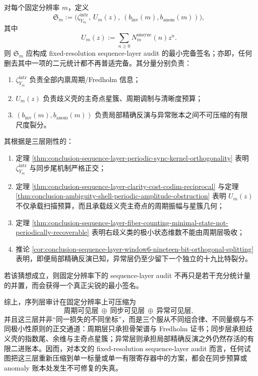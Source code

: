 \begin{conjecture}\label{conj:conclusion-sequence-layer-minimal-complete-audit-signature-triple}
对每个固定分辨率 \(m\)，定义
\[
\mathfrak S_m
:=
\bigl(
\zeta_{Y_m}^{\mathrm{intr}},
\ U_m(z),
\ (b_{\mathrm{inv}}(m),b_{\mathrm{anom}}(m))
\bigr),
\]
其中
\[
U_m(z):=\sum_{n\ge 0}N_m^{\mathrm{unsync}}(n)z^n.
\]
则 \(\mathfrak S_m\) 应构成 fixed-resolution sequence-layer audit 的最小完备签名；亦即，任何删去其中一项的二元统计都不再普适完备。其分量分别负责：
\begin{enumerate}
  \item \(\zeta_{Y_m}^{\mathrm{intr}}\) 负责全部内禀周期/Fredholm 信息；
  \item \(U_m(z)\) 负责歧义壳的主奇点星簇、周期调制与清晰度预算；
  \item \((b_{\mathrm{inv}}(m),b_{\mathrm{anom}}(m))\) 负责局部精确反演与异常账本之间不可压缩的有限尺度裂分。
\end{enumerate}
其根据是三层刚性的：
\begin{enumerate}
  \item 定理 \ref{thm:conclusion-sequence-layer-periodic-sync-kernel-orthogonality} 表明 \(\zeta_{Y_m}^{\mathrm{intr}}\) 与同步尾机制严格正交；
  \item 定理 \ref{thm:conclusion-sequence-layer-clarity-cost-codim-reciprocal} 与定理 \ref{thm:conclusion-ambiguity-shell-periodic-amplitude-obstruction} 表明 \(U_m(z)\) 不仅承载扫描预算，而且承载歧义壳主奇点的周期振幅与星簇几何；
  \item 定理 \ref{thm:conclusion-sequence-layer-fiber-counting-minimal-state-not-periodically-recoverable} 表明右歧义类的极小状态维数不能由周期层吸收；
  \item 推论 \ref{cor:conclusion-sequence-layer-window6-nineteen-bit-orthogonal-splitting} 表明，即便局部精确反演已知，异常层仍至少留下一个独立的十九比特裂分。
\end{enumerate}
若该猜想成立，则固定分辨率下的 sequence-layer audit 不再只是若干充分统计量的并置，而会获得一个真正尖锐的最小签名。
\end{conjecture}

综上，序列层审计在固定分辨率上可压缩为
\[
\text{周期可见层}
\ \oplus\
\text{同步可见层}
\ \oplus\
\text{异常可见层},
\]
并且这三层并非“同一损失的不同坐标”，而是三个服从不同组合律、不同量纲与不同极小性原则的正交通道：周期层只承担骨架谱与 Fredholm 证书；同步层承担歧义壳的指数尾、余维与主奇点星簇；异常层则承担局部精确反演之外仍然存活的有限二进账本。因而，对本文的 fixed-resolution sequence-layer audit 而言，任何试图把这三层重新压缩到单一标量或单一有限寄存器中的方案，都会在同步预算或 anomaly 账本处发生不可修复的失真。

\endinput
